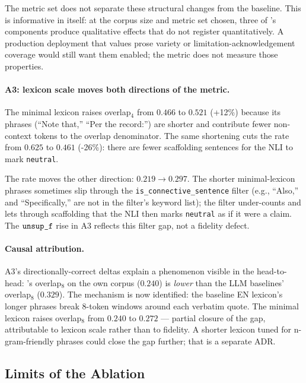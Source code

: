 The metric set does not separate these structural changes from
the baseline. This is informative in itself: at the corpus size
and metric set chosen, three of \hyphae{}'s components produce
qualitative effects that do not register quantitatively. A
production deployment that values prose variety or
limitation-acknowledgement coverage would still want them
enabled; the metric does not measure those properties.

\paragraph{A3: lexicon scale moves both directions of the metric.}

The minimal lexicon raises overlap$_4$ from $0.466$ to $0.521$
(+12\%) because its phrases (``Note that,'' ``Per the record:'')
are shorter and contribute fewer non-context tokens to the
overlap denominator. The same shortening cuts the \unsupr{} rate
from $0.625$ to $0.461$ (-26\%): there are fewer scaffolding
sentences for the NLI to mark \texttt{neutral}.

The \unsupf{} rate moves the other direction: $0.219 \to 0.297$.
The shorter minimal-lexicon phrases sometimes slip through the
\texttt{is\_connective\_sentence} filter (e.g., ``Also,'' and
``Specifically,'' are not in the filter's keyword list); the
filter under-counts and lets through scaffolding that the NLI
then marks \texttt{neutral} as if it were a claim. The
$\texttt{unsup\_f}{}$ rise in A3 reflects this filter gap, not a
fidelity defect.

\paragraph{Causal attribution.}

A3's directionally-correct deltas explain a phenomenon visible
in the head-to-head: \hyphae{}'s overlap$_8$ on the own corpus
($0.240$) is \emph{lower} than the LLM baselines' overlap$_8$
($0.329$). The mechanism is now identified: the baseline EN
lexicon's longer phrases break 8-token windows around each
verbatim quote. The minimal lexicon raises overlap$_8$ from
$0.240$ to $0.272$ --- partial closure of the gap, attributable
to lexicon scale rather than to fidelity. A shorter lexicon
tuned for n-gram-friendly phrases could close the gap further;
that is a separate ADR.

\subsection{Limits of the Ablation}


